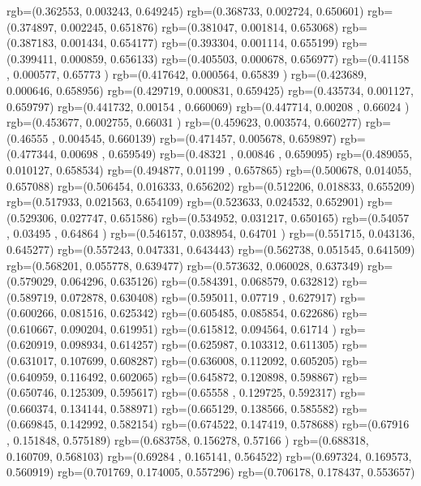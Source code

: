 {{{		  rgb=(0.362553,  0.003243,  0.649245)
		  rgb=(0.368733,  0.002724,  0.650601)
		  rgb=(0.374897,  0.002245,  0.651876)
		  rgb=(0.381047,  0.001814,  0.653068)
		  rgb=(0.387183,  0.001434,  0.654177)
		  rgb=(0.393304,  0.001114,  0.655199)
		  rgb=(0.399411,  0.000859,  0.656133)
		  rgb=(0.405503,  0.000678,  0.656977)
		  rgb=(0.41158 ,  0.000577,  0.65773 )
		  rgb=(0.417642,  0.000564,  0.65839 )
		  rgb=(0.423689,  0.000646,  0.658956)
		  rgb=(0.429719,  0.000831,  0.659425)
		  rgb=(0.435734,  0.001127,  0.659797)
		  rgb=(0.441732,  0.00154 ,  0.660069)
		  rgb=(0.447714,  0.00208 ,  0.66024 )
		  rgb=(0.453677,  0.002755,  0.66031 )
		  rgb=(0.459623,  0.003574,  0.660277)
		  rgb=(0.46555 ,  0.004545,  0.660139)
		  rgb=(0.471457,  0.005678,  0.659897)
		  rgb=(0.477344,  0.00698 ,  0.659549)
		  rgb=(0.48321 ,  0.00846 ,  0.659095)
		  rgb=(0.489055,  0.010127,  0.658534)
		  rgb=(0.494877,  0.01199 ,  0.657865)
		  rgb=(0.500678,  0.014055,  0.657088)
		  rgb=(0.506454,  0.016333,  0.656202)
		  rgb=(0.512206,  0.018833,  0.655209)
		  rgb=(0.517933,  0.021563,  0.654109)
		  rgb=(0.523633,  0.024532,  0.652901)
		  rgb=(0.529306,  0.027747,  0.651586)
		  rgb=(0.534952,  0.031217,  0.650165)
		  rgb=(0.54057 ,  0.03495 ,  0.64864 )
		  rgb=(0.546157,  0.038954,  0.64701 )
		  rgb=(0.551715,  0.043136,  0.645277)
		  rgb=(0.557243,  0.047331,  0.643443)
		  rgb=(0.562738,  0.051545,  0.641509)
		  rgb=(0.568201,  0.055778,  0.639477)
		  rgb=(0.573632,  0.060028,  0.637349)
		  rgb=(0.579029,  0.064296,  0.635126)
		  rgb=(0.584391,  0.068579,  0.632812)
		  rgb=(0.589719,  0.072878,  0.630408)
		  rgb=(0.595011,  0.07719 ,  0.627917)
		  rgb=(0.600266,  0.081516,  0.625342)
		  rgb=(0.605485,  0.085854,  0.622686)
		  rgb=(0.610667,  0.090204,  0.619951)
		  rgb=(0.615812,  0.094564,  0.61714 )
		  rgb=(0.620919,  0.098934,  0.614257)
		  rgb=(0.625987,  0.103312,  0.611305)
		  rgb=(0.631017,  0.107699,  0.608287)
		  rgb=(0.636008,  0.112092,  0.605205)
		  rgb=(0.640959,  0.116492,  0.602065)
		  rgb=(0.645872,  0.120898,  0.598867)
		  rgb=(0.650746,  0.125309,  0.595617)
		  rgb=(0.65558 ,  0.129725,  0.592317)
		  rgb=(0.660374,  0.134144,  0.588971)
		  rgb=(0.665129,  0.138566,  0.585582)
		  rgb=(0.669845,  0.142992,  0.582154)
		  rgb=(0.674522,  0.147419,  0.578688)
		  rgb=(0.67916 ,  0.151848,  0.575189)
		  rgb=(0.683758,  0.156278,  0.57166 )
		  rgb=(0.688318,  0.160709,  0.568103)
		  rgb=(0.69284 ,  0.165141,  0.564522)
		  rgb=(0.697324,  0.169573,  0.560919)
		  rgb=(0.701769,  0.174005,  0.557296)
		  rgb=(0.706178,  0.178437,  0.553657)
}}}
